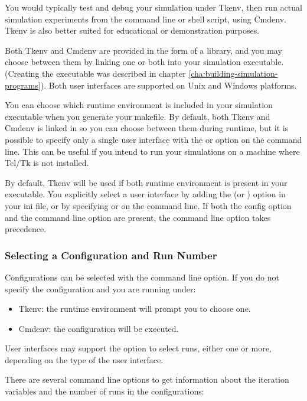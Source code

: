 You would typically test and debug your simulation under Tkenv,
then run actual simulation experiments from the command line or
shell script, using Cmdenv. Tkenv is also better suited for educational or
demonstration purposes.

Both Tkenv and Cmdenv are provided in the form of a library, and
you may choose between them by linking one or both into your
simulation executable. (Creating the executable was described in
chapter \ref{cha:building-simulation-programs}). Both user interfaces
are supported on Unix and Windows platforms.

You can choose which runtime environment is included in your simulation
executable when you generate your makefile. By default, both Tkenv and
Cmdenv is linked in so you can choose between them during runtime, but it
is possible to specify only a single user interface with the  or  option on the  command line.
This can be useful if you intend to run your simulations on a machine where
Tcl/Tk is not installed.

By default, Tkenv will be used if both runtime environment is present in
your executable. You explicitly select a user interface by adding the
 (or ) option in your ini file, or
by specifying  or  on the command line. If
both the config option and the command line option are present, the command
line option takes precedence.

\subsubsection{Selecting a Configuration and Run Number}

Configurations can be selected with the  command line option.
If you do not specify the configuration and you are running under:

\begin{itemize}
  \item Tkenv: the runtime environment will prompt you to choose one.
  \item Cmdenv: the  configuration will be executed.
\end{itemize}

User interfaces may support the  option to select runs,
either one or more, depending on the type of the user interface.

There are several command line options to get information about the iteration
variables and the number of runs in the configurations:

